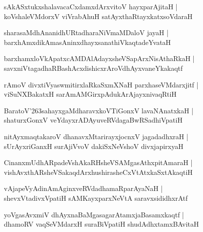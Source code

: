 \documentclass[twoside,12pt,openright]{book}
\def\S{\char'263}
\newcounter{shloka}[chapter]
\begin{document}
\begin{shloka}%
sAkASxtukxshalavacaCxdamxdArxvitoV hayxparAjitaH |\\
koVshaleVMdorxV viVrabAhuH satAyxthaRtayxkatxsoVdaraH
\end{shloka}

\begin{shloka}%
sharasaMdhAnanidhURtadharaNiVmaMDaloV jayaH |\\
barxhAmxdikAmasAninxdhayxsanathiVkaqtadeYvataH 
\end{shloka}

\begin{shloka}%
barxhamxloVkApatxcAMDAlAdayxsheVSapArxNisAthaRkaH |\\
savxniVtagadhaRBashAcxdishicxrAroVdhAyxvaneYkakaqtf
\end{shloka}

\begin{shloka}%
rAmoV divxtiVyaswmitirxlaRkaSxmXNaH parxhaseVMdarxjitf |\\
viSuNXBakatxH sarAmAMGirxpAdukArAjayxnivaqRtiH
\end{shloka}

\begin{shloka}%
BaratoV\S sahayxgaMdharavxkoVTiGonxV lavaNAnatxkaH |\\
shaturxGonxV veYdayxrADAyuveRVdagaBwRSadhiVpatiH 
\end{shloka}

\begin{shloka}%
nitAyxmaqtakaroV dhanavxMtarirayxjocnxV jagadadhxraH |\\
sUrAyxriGanxH surAjiVvoV dakiSxNeVshoV divxjapirxyaH 
\end{shloka}

\begin{shloka}%
CinanxmUdhARpadeVshAkaRHsheVSAMgasAthxpitAmaraH |\\
vishAvxthARsheVSakaqdArxhushirasheCxVtAtxkaSxtAkaqtiH
\end{shloka}

\begin{shloka}%
vAjapeVyAdinAmAginxveRVdadhamaRparAyaNaH |\\
shevxVtadivxVpatiH sAMKayxparxNeVtA saravxsididhxrAtf 
\end{shloka}

\begin{shloka}%
yoVgasAvxmiV dhAyxnaBaMgasagarAtamxjaBasamxkaqtf |\\
dhamoRV vaqSeVMdarxH suraBiVpatiH shudAdhxtamxBAvitaH 
\end{shloka}
\end{document}
